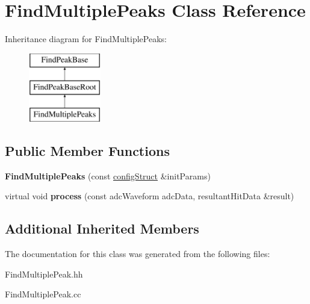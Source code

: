 \hypertarget{class_find_multiple_peaks}{}\section{Find\+Multiple\+Peaks Class Reference}
\label{class_find_multiple_peaks}
Inheritance diagram for Find\+Multiple\+Peaks\+:\begin{figure}[H]
\begin{center}
\leavevmode
\includegraphics[height=3.000000cm]{class_find_multiple_peaks}
\end{center}
\end{figure}
\subsection*{Public Member Functions}
\begin{DoxyCompactItemize}
\item 
\hypertarget{class_find_multiple_peaks_ae0fd95088520b85c5c02ae182241c2da}{}{\bfseries Find\+Multiple\+Peaks} (const \hyperlink{structconfig_struct}{config\+Struct} \&init\+Params)\label{class_find_multiple_peaks_ae0fd95088520b85c5c02ae182241c2da}

\item 
\hypertarget{class_find_multiple_peaks_a26011d385dff3edd1dd818862bcf6c5d}{}virtual void {\bfseries process} (const adc\+Waveform adc\+Data, resultant\+Hit\+Data \&result)\label{class_find_multiple_peaks_a26011d385dff3edd1dd818862bcf6c5d}

\end{DoxyCompactItemize}
\subsection*{Additional Inherited Members}


The documentation for this class was generated from the following files\+:\begin{DoxyCompactItemize}
\item 
Find\+Multiple\+Peak.\+hh\item 
Find\+Multiple\+Peak.\+cc\end{DoxyCompactItemize}
